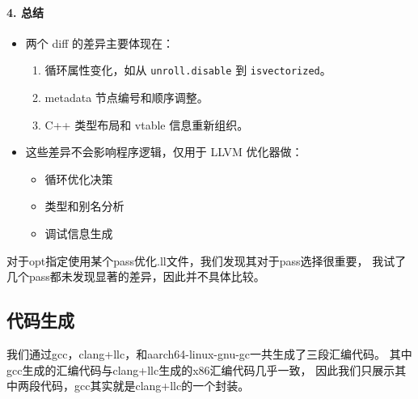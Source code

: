 \documentclass[UTF8,a4paper,10pt]{ctexart}
\begin{document}
\paragraph{4. 总结}
\begin{itemize}
    \item 两个 diff 的差异主要体现在：
    \begin{enumerate}
        \item 循环属性变化，如从 \texttt{unroll.disable} 到 \texttt{isvectorized}。
        \item metadata 节点编号和顺序调整。
        \item C++ 类型布局和 vtable 信息重新组织。
    \end{enumerate}
    \item 这些差异不会影响程序逻辑，仅用于 LLVM 优化器做：
    \begin{itemize}
        \item 循环优化决策
        \item 类型和别名分析
        \item 调试信息生成
    \end{itemize}
\end{itemize}
\par
对于opt指定使用某个pass优化.ll文件，我们发现其对于pass选择很重要，
我试了几个pass都未发现显著的差异，因此并不具体比较。

\subsection{代码生成}
我们通过gcc，clang+llc，和aarch64-linux-gnu-gc一共生成了三段汇编代码。
其中gcc生成的汇编代码与clang+llc生成的x86汇编代码几乎一致，
因此我们只展示其中两段代码，gcc其实就是clang+llc的一个封装。
\end{document}
